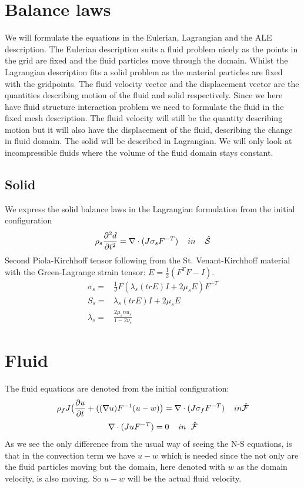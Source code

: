 \section*{Balance laws}
We will formulate the equations in the Eulerian, Lagrangian and the ALE description.
The Eulerian description suits a fluid problem nicely as the points in the grid are fixed and the fluid particles move through the domain. Whilst the Lagrangian description fits a solid problem as the material particles are fixed with the gridpoints. The fluid velocity vector and the displacement vector are the quantities describing motion of the fluid and solid respectively. Since we here have fluid structure interaction problem we need to formulate the fluid in the fixed mesh description. The fluid velocity will still be the quantity describing motion but it will also have the displacement of the fluid, describing the change in fluid domain. The solid will be described in Lagrangian. We will only look at incompressible fluids where the volume of the fluid domain stays constant.\\
\subsection*{Solid}
We express the solid balance laws in the Lagrangian formulation from the initial configuration
$$\rho_s \frac{\partial^2 d}{\partial t^2} = \nabla \cdot (J \sigma_s F^{-T}) \hspace{4mm}in\hspace{4mm} \mathcal{\hat{S}} $$
Second Piola-Kirchhoff tensor following from the St. Venant-Kirchhoff material with the  Green-Lagrange strain tensor: $  E = \frac{1}{2}(F^TF- I)  $.
\begin{align*}
 \sigma_s = & \frac{1}{J} F (\lambda_s (tr E)I + 2\mu_s E) F^{-T}  \\
 S_s = & \lambda_s (tr E)I + 2\mu_s E  \\
\lambda_s = & \frac{2\mu_s nu_s}{1-2 \nu_s} 
\end{align*}
\section*{Fluid}
The fluid equations are denoted from the initial configuration:
$$ \rho_f J \big( \frac{\partial u}{\partial t} + ((\nabla u)F^{-1}(u-w)\big) = \nabla \cdot (J\sigma_f F^{-T} )\hspace{4mm} in \mathcal{\hat{F}}$$
$$ \nabla \cdot (J u F^{-T}) = 0 \hspace{4mm} in \hspace{2mm} \mathcal{\hat{F}}$$
As we see the only difference from the usual way of seeing the N-S equations, is that in the convection term we have $u-w $ which is needed since the not only are the fluid particles moving but the domain, here denoted with $w$ as the domain velocity, is also moving. So $u-w$ will be the actual fluid velocity. 

